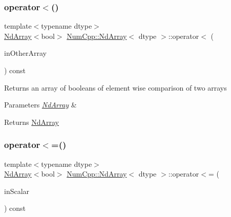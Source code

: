 \subsubsection{\texorpdfstring{operator$<$()}{operator<()}\hspace{0.1cm}{\footnotesize\ttfamily [2/2]}}
{\footnotesize\ttfamily template$<$typename dtype$>$ \\
\mbox{\hyperlink{class_num_cpp_1_1_nd_array}{Nd\+Array}}$<$bool$>$ \mbox{\hyperlink{class_num_cpp_1_1_nd_array}{Num\+Cpp\+::\+Nd\+Array}}$<$ dtype $>$\+::operator$<$ (\begin{DoxyParamCaption}\item[{const \mbox{\hyperlink{class_num_cpp_1_1_nd_array}{Nd\+Array}}$<$ dtype $>$ \&}]{in\+Other\+Array }\end{DoxyParamCaption}) const\hspace{0.3cm}{\ttfamily [inline]}}

Returns an array of booleans of element wise comparison of two arrays


\begin{DoxyParams}{Parameters}
{\em \mbox{\hyperlink{class_num_cpp_1_1_nd_array}{Nd\+Array}}} & \\
\hline
\end{DoxyParams}
\begin{DoxyReturn}{Returns}
\mbox{\hyperlink{class_num_cpp_1_1_nd_array}{Nd\+Array}} 
\end{DoxyReturn}
\mbox{\label{class_num_cpp_1_1_nd_array_ada62322c47c41725df9666743974b8c1}} 
\subsubsection{\texorpdfstring{operator$<$=()}{operator<=()}\hspace{0.1cm}{\footnotesize\ttfamily [1/2]}}
{\footnotesize\ttfamily template$<$typename dtype$>$ \\
\mbox{\hyperlink{class_num_cpp_1_1_nd_array}{Nd\+Array}}$<$bool$>$ \mbox{\hyperlink{class_num_cpp_1_1_nd_array}{Num\+Cpp\+::\+Nd\+Array}}$<$ dtype $>$\+::operator$<$= (\begin{DoxyParamCaption}\item[{dtype}]{in\+Scalar }\end{DoxyParamCaption}) const\hspace{0.3cm}{\ttfamily [inline]}}

